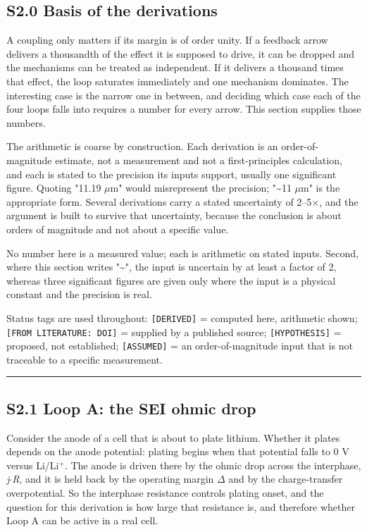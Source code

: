 \documentclass[11pt,a4paper]{article}
\begin{document}
\subsection*{S2.0 Basis of the derivations}


A coupling only matters if its margin is of order unity. If a feedback arrow delivers a thousandth of the effect it is supposed to drive, it can be dropped and the mechanisms can be treated as independent. If it delivers a thousand times that effect, the loop saturates immediately and one mechanism dominates. The interesting case is the narrow one in between, and deciding which case each of the four loops falls into requires a number for every arrow. This section supplies those numbers.


The arithmetic is coarse by construction. Each derivation is an order-of-magnitude estimate, not a measurement and not a first-principles calculation, and each is stated to the precision its inputs support, usually one significant figure. Quoting "11.19 \ensuremath{\mu}m" would misrepresent the precision; "\textasciitilde{}11 \ensuremath{\mu}m" is the appropriate form. Several derivations carry a stated uncertainty of 2--5\ensuremath{\times}, and the argument is built to survive that uncertainty, because the conclusion is about orders of magnitude and not about a specific value.


No number here is a measured value; each is arithmetic on stated inputs. Second, where this section writes "\textasciitilde{}", the input is uncertain by at least a factor of 2, whereas three significant figures are given only where the input is a physical constant and the precision is real.


Status tags are used throughout: \texttt{[DERIVED]} = computed here, arithmetic shown; \texttt{[FROM LITERATU}\hspace{0pt}\texttt{RE: DOI]} = supplied by a published source; \texttt{[HYPOTHESIS]} = proposed, not established; \texttt{[ASSUMED]} = an order-of-magnitude input that is not traceable to a specific measurement.


\par\noindent\rule{\linewidth}{0.4pt}\par


\subsection*{S2.1 Loop A: the SEI ohmic drop}


Consider the anode of a cell that is about to plate lithium. Whether it plates depends on the anode potential: plating begins when that potential falls to 0 V versus Li/Li\ensuremath{^{+}}. The anode is driven there by the ohmic drop across the interphase, \emph{j\ensuremath{\cdot}R}, and it is held back by the operating margin \ensuremath{\Delta} and by the charge-transfer overpotential. So the interphase resistance controls plating onset, and the question for this derivation is how large that resistance is, and therefore whether Loop A can be active in a real cell.
\end{document}
